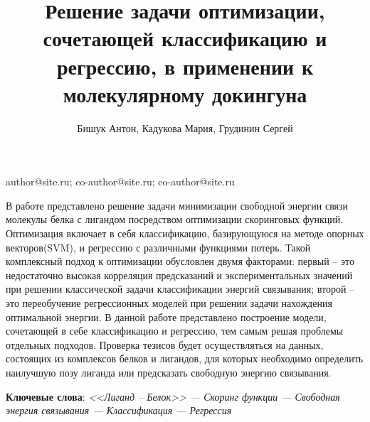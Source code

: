 \documentclass[12pt, twoside]{article}
\begin{document}
\title
    [Шаблон статьи для публикации] %
    {Решение задачи оптимизации, сочетающей классификацию и регрессию, в применении к молекулярному докингуна}
\author
    { Бишук Антон, Кадукова Мария, Грудинин Сергей} %

\email
    {author@site.ru; co-author@site.ru;  co-author@site.ru}

\abstract
    {
    	В работе представлено решение задачи минимизации свободной энергии связи молекулы белка с лигандом посредством оптимизации скоринговых функций. Оптимизация включает в себя классификацию, базирующуюся на методе опорных векторов(SVM), и регрессию с различными функциями потерь. Такой комплексный подход к оптимизации обусловлен двумя факторами: первый --  это недостаточно высокая корреляция предсказаний и экспериментальных значений при решении классической задачи классификации энергий связывания; второй -- это переобучение регрессионных моделей при решении задачи нахождения оптимальной энергии. В данной работе представлено построение модели, сочетающей в себе классификацию и регрессию, тем самым решая проблемы отдельных подходов. Проверка тезисов будет осуществляться на данных, состоящих из комплексов белков и лигандов, для которых необходимо определить наилучшую позу лиганда или предсказать свободную энергию связывания.
	
	
\bigskip
\noindent
\textbf{Ключевые слова}: \emph {<<Лиганд -- Белок>> --- Скоринг функции --- Свободная энергия связывания --- Классификация --- Регрессия}
}



\maketitle
\end{document}
